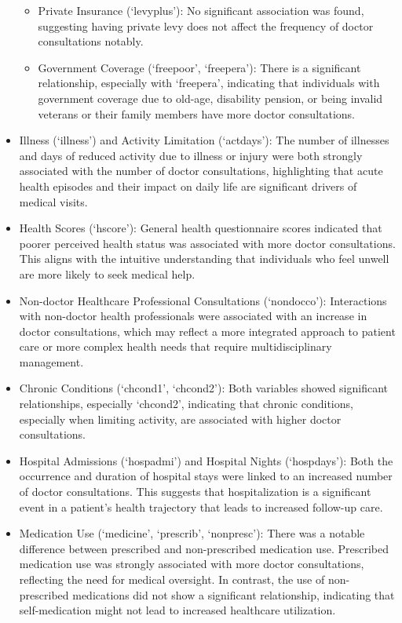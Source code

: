 \documentclass[
]{article}
\begin{document}
\begin{itemize}
  \begin{itemize}
  \item
    Private Insurance (`levyplus'): No significant association was
    found, suggesting having private levy does not affect the frequency
    of doctor consultations notably.
  \item
    Government Coverage (`freepoor', `freepera'): There is a significant
    relationship, especially with `freepera', indicating that
    individuals with government coverage due to old-age, disability
    pension, or being invalid veterans or their family members have more
    doctor consultations.
  \end{itemize}
\item
  Illness (`illness') and Activity Limitation (`actdays'): The number of
  illnesses and days of reduced activity due to illness or injury were
  both strongly associated with the number of doctor consultations,
  highlighting that acute health episodes and their impact on daily life
  are significant drivers of medical visits.
\item
  Health Scores (`hscore'): General health questionnaire scores
  indicated that poorer perceived health status was associated with more
  doctor consultations. This aligns with the intuitive understanding
  that individuals who feel unwell are more likely to seek medical help.
\item
  Non-doctor Healthcare Professional Consultations (`nondocco'):
  Interactions with non-doctor health professionals were associated with
  an increase in doctor consultations, which may reflect a more
  integrated approach to patient care or more complex health needs that
  require multidisciplinary management.
\item
  Chronic Conditions (`chcond1', `chcond2'): Both variables showed
  significant relationships, especially `chcond2', indicating that
  chronic conditions, especially when limiting activity, are associated
  with higher doctor consultations.
\item
  Hospital Admissions (`hospadmi') and Hospital Nights (`hospdays'):
  Both the occurrence and duration of hospital stays were linked to an
  increased number of doctor consultations. This suggests that
  hospitalization is a significant event in a patient's health
  trajectory that leads to increased follow-up care.
\item
  Medication Use (`medicine', `prescrib', `nonpresc'): There was a
  notable difference between prescribed and non-prescribed medication
  use. Prescribed medication use was strongly associated with more
  doctor consultations, reflecting the need for medical oversight. In
  contrast, the use of non-prescribed medications did not show a
  significant relationship, indicating that self-medication might not
  lead to increased healthcare utilization.
\end{itemize}
\end{document}
